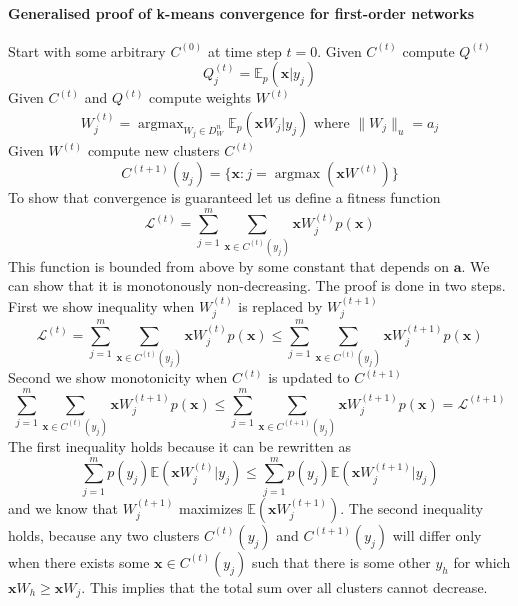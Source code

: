 \documentclass[12pt]{article}
\DeclareMathOperator*{\argmax}{argmax}
\begin{document}
\paragraph{Generalised proof of k-means convergence for first-order networks}
Start with some arbitrary $C^{(0)}$ at time step $t=0$. Given $C^{(t)}$ compute $Q^{(t)}$
\[
Q^{(t)}_j = \mathbb{E}_p(\boldsymbol{x}|y_j)
\]
Given $C^{(t)}$ and $Q^{(t)}$ compute weights $W^{(t)}$
\begin{gather*}
	W_j^{(t)} = \argmax_{W_j\in D_W^{n}} \mathbb{E}_p(\boldsymbol{x}W_j|y_j)\text{ where } \lVert W_j \rVert_u=a_j
\end{gather*}
Given $W^{(t)}$ compute new clusters $C^{(t)}$
\[
C^{(t+1)}(y_j) = \{\boldsymbol{x} : j=\argmax(\boldsymbol{x}W^{(t)})\}
\]
To show that convergence is guaranteed let us define a fitness function
\[
\mathcal{L}^{(t)} = \sum_{j=1}^m \sum_{\boldsymbol{x}\in C^{(t)}(y_j)} \boldsymbol{x} W_j^{(t)} p(\boldsymbol{x})
\] 
This function is bounded from above by some constant that depends on $\boldsymbol{a}$. We can show that it is monotonously non-decreasing. The proof is done in two steps. First we show inequality when $W_j^{(t)}$  is replaced by $W_j^{(t+1)}$
\[\mathcal{L}^{(t)}= \sum_{j=1}^m \sum_{\boldsymbol{x}\in C^{(t)}(y_j)} \boldsymbol{x} W_j^{(t)} p(\boldsymbol{x}) \le \sum_{j=1}^m \sum_{\boldsymbol{x}\in C^{(t)}(y_j)} \boldsymbol{x}W_j^{(t+1)} p(\boldsymbol{x})\] 
Second we show monotonicity when $C^{(t)}$ is updated to $C^{(t+1)}$
\[\sum_{j=1}^m \sum_{\boldsymbol{x}\in C^{(t)}(y_j)} \boldsymbol{x} W_j^{(t+1)} p(\boldsymbol{x}) \le \sum_{j=1}^m \sum_{\boldsymbol{x}\in C^{(t+1)}(y_j)} \boldsymbol{x} W_j^{(t+1)} p(\boldsymbol{x})=\mathcal{L}^{(t+1)}\] 
The first inequality holds because it can be rewritten as
\[\sum_{j=1}^m p(y_j) \mathbb{E}(\boldsymbol{x} W_j^{(t)}|y_j)  \le \sum_{j=1}^m  p(y_j)  \mathbb{E}(\boldsymbol{x}W_j^{(t+1)}|y_j)\] 
and we know that $W_j^{(t+1)}$ maximizes $\mathbb{E}(\boldsymbol{x}W_j^{(t+1)})$.
The second inequality holds, because any two clusters $C^{(t)}(y_j)$ and  $C^{(t+1)}(y_j)$ will differ only when there exists some $\boldsymbol{x}\in C^{(t)}(y_j)$ such that there is some other $y_h$ for which $\boldsymbol{x}W_h \ge \boldsymbol{x} W_j$. This implies that the total sum over all clusters cannot decrease.
\end{document}
